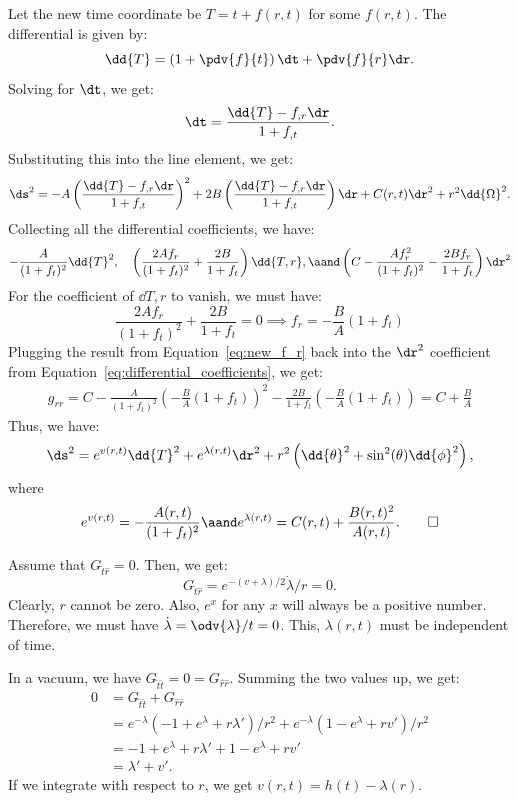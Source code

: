 \begin{solution}[(i)]
  Let the new time coordinate be $T = t + f(r, t)$ for some $f(r, t)$. The differential is given by:
  \[%
    \dd{T} = \left(1 + \pdv{f}{t}\right) \dt + \pdv{f}{r} \dr
  .\]%
  Solving for $\dt$, we get:
  \[%
    \dt = \frac{\dd{T} - f_{,r} \dr}{1 + f_{,t}}
  .\]%
  Substituting this into the line element, we get:
  \[%
    \ds^2 = -A\left(\frac{\dd{T} - f_{,r} \dr}{1 + f_{,t}}\right)^2 + 2B\left(\frac{\dd{T} - f_{,r} \dr}{1 + f_{,t}}\right) \dr + C(r, t)\dr^2 + r^2\dd{\Omega}^2
  .\]%
  Collecting all the differential coefficients, we have:
  \begin{equation}\label{eq:differential_coefficients}
    -\frac{A}{(1 + f_t)^2}\dd{T}^2, \quad \left(\frac{2Af_r}{(1 + f_t)^2} + \frac{2B}{1 + f_t}\right)\dd{T,r}, \aand \left(C - \frac{Af_r^2}{(1 + f_t)^2} - \frac{2Bf_r}{1 + f_t}\right)\dr^2
  \end{equation}
  For the coefficient of $\dd{T,r}$ to vanish, we must have:
  \begin{equation}\label{eq:new_f_r}
    \frac{2Af_r}{(1 + f_t)^2} + \frac{2B}{1 + f_t} = 0 \implies f_r = -\frac{B}{A}(1 + f_t)
  \end{equation}
  Plugging the result from Equation~\eqref{eq:new_f_r} back into the $\dr^2$ coefficient from Equation~\eqref{eq:differential_coefficients}, we get:
  \begin{gather*}
    g_{rr} = C - \frac{A}{(1 + f_t)^2}\left(-\frac{B}{A}(1 + f_t)\right)^2 - \frac{2B}{1 + f_t}\left(-\frac{B}{A}(1 + f_t)\right) = C + \frac{B}{A}
  \end{gather*}
  Thus, we have:
  \[%
    \ds^2 = e^{v(r,t)}\dd{T}^2 + e^{\lambda(r,t)}\dr^2 + r^2\left(\dd{\theta}^2 + \sin^2(\theta)\dd{\phi}^2\right)
  ,\]%
  where
  \[%
    e^{v(r,t)} = -\frac{A(r, t)}{(1 + f_t)^2} \aand e^{\lambda(r,t)} = C(r, t) + \frac{B(r, t)^2}{A(r, t)}
  .\qedhere\]%
\end{solution}

\begin{solution}[(ii)]
  Assume that $G_{\hat{t}\hat{r}} = 0$. Then, we get:
  \[%
    G_{\hat{t}\hat{r}} = e^{-(v+\lambda)/2}\dot{\lambda}/r = 0
  .\]%
  Clearly, $r$ cannot be zero. Also, $e^x$ for any $x$ will always be a positive number. Therefore, we must have $\dot{\lambda} = \odv{\lambda}/{t} = 0$. This, $\lambda(r, t)$ must be independent of time.

  In a vacuum, we have $G_{\hat{t}\hat{t}} = 0 = G_{\hat{r}\hat{r}}$. Summing the two values up, we get:
  \begin{align*}
    0 &= G_{\hat{t}\hat{t}} + G_{\hat{r}\hat{r}} \\
      &= e^{-\lambda}\left(-1 + e^\lambda + r\lambda'\right)/r^2 + e^{-\lambda}\left(1 - e^\lambda + rv'\right)/r^2 \\
      &= -1 + e^\lambda + r\lambda' + 1 - e^\lambda + rv' \\
      &= \lambda' + v'
  .\end{align*}
  If we integrate with respect to $r$, we get $v(r, t) = h(t) - \lambda(r)$.
\end{solution}

